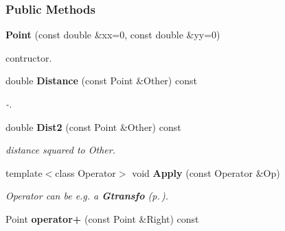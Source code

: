 \subsubsection*{Public Methods}
\begin{CompactItemize}
\item 
{}
{\bf Point} (const double \&xx=0, const double \&yy=0)\label{class_point_a0}

\begin{CompactList}\small\item\em \begin{CompactItemize}
\item 
contructor.\end{CompactItemize}
\item\end{CompactList}\item 
{}
double {\bf Distance} (const Point \&Other) const\label{class_point_a1}

\begin{CompactList}\small\item\em -.\item\end{CompactList}\item 
{}
double {\bf Dist2} (const Point \&Other) const\label{class_point_a2}

\begin{CompactList}\small\item\em distance squared to Other.\item\end{CompactList}\item 
{}
template$<$class Operator$>$ void {\bf Apply} (const Operator \&Op)\label{class_point_a3}

\begin{CompactList}\small\item\em Operator can be e.g. a {\bf Gtransfo} {\rm (p.\,\pageref{class_gtransfo})}.\item\end{CompactList}\item 
{}
Point {\bf operator+} (const Point \&Right) const\label{class_point_a4}


\end{CompactItemize}
